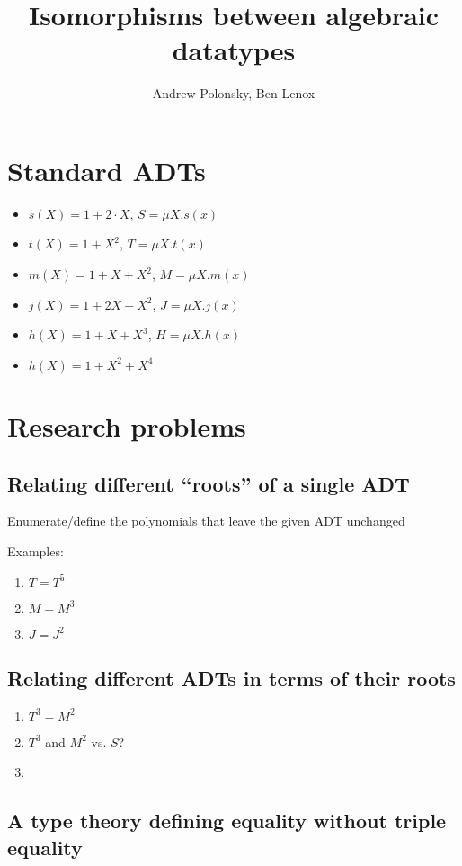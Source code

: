 \documentclass[letterpaper,numbers=enddot]{scrartcl}
\title{Isomorphisms between algebraic datatypes}
\author{Andrew Polonsky, Ben Lenox}
\begin{document}
\maketitle

\section{Standard ADTs}
\begin{itemize}
  \item $s(X) = 1 + 2\cdot X$, $S = \mu X. s(x)$
  \item $t(X) = 1 + X^2$, $T = \mu X. t(x)$
  \item $m(X) = 1 + X + X^2$, $M = \mu X. m(x)$
  \item $j(X) = 1 + 2X + X^2$, $J = \mu X. j(x)$
  \item $h(X) = 1 + X + X^3$, $H = \mu X. h(x)$
  \item $h(X) = 1 + X^2 + X^4$
\end{itemize}

\section{Research problems}
\subsection{Relating different ``roots'' of a single ADT}

Enumerate/define the polynomials that leave the given ADT unchanged

Examples:
\begin{enumerate}
  \item $T = T^5$
  \item $M = M^3$
  \item $J = J^2$
\end{enumerate}

\subsection{Relating different ADTs in terms of their roots}
\begin{enumerate}
  \item $T^3 = M^2$
  \item $T^3$ and $M^2$ vs. $S$?
  \item
\end{enumerate}

\subsection{A type theory defining equality without triple equality}
\end{document}
